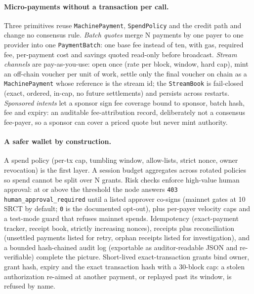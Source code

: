 \documentclass{article}
\begin{document}
\paragraph{Micro-payments without a transaction per call.} Three primitives reuse
\texttt{MachinePayment}, \texttt{SpendPolicy} and the credit path and change no
consensus rule. \emph{Batch quotes} merge N payments by one payer to one
provider into one \texttt{PaymentBatch}: one base fee instead of ten, with gas,
required fee, per-payment cost and savings quoted read-only before broadcast.
\emph{Stream channels} are pay-as-you-use: open once (rate per block, window,
hard cap), mint an off-chain voucher per unit of work, settle only the final
voucher on chain as a \texttt{MachinePayment} whose reference is the stream id;
the \texttt{StreamBook} is fail-closed (exact, ordered, in-cap, no future
settlements) and persists across restarts. \emph{Sponsored intents} let a sponsor
sign fee coverage bound to sponsor, batch hash, fee and expiry: an auditable
fee-attribution record, deliberately not a consensus fee-payer, so a sponsor can
cover a priced quote but never mint authority.

\paragraph{A safer wallet by construction.} A spend policy (per-tx cap, tumbling
window, allow-lists, strict nonce, owner revocation) is the first layer. A
session budget aggregates across rotated policies so spend cannot be split over
N grants. Risk checks enforce high-value human approval: at or above the
threshold the node answers \texttt{403 human\_approval\_required} until a listed
approver co-signs (mainnet gates at 10 SRCT by default; \texttt{0} is the
documented opt-out), plus per-payer velocity caps and a test-mode guard that
refuses mainnet spends. Idempotency (exact-payment tracker, receipt book,
strictly increasing nonces), receipts plus reconciliation (unsettled payments
listed for retry, orphan receipts listed for investigation), and a bounded
hash-chained audit log (exportable as auditor-readable JSON and re-verifiable)
complete the picture. Short-lived exact-transaction grants bind owner, grant
hash, expiry and the exact transaction hash with a 30-block cap: a stolen
authorization re-aimed at another payment, or replayed past its window, is
refused by name.
\end{document}
